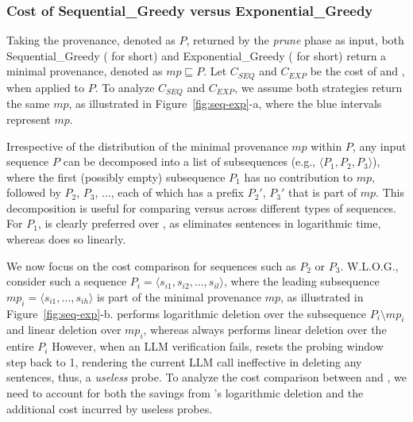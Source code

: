 \subsubsection{Cost of Sequential\_Greedy versus Exponential\_Greedy}
\label{subsubsec:seq-exp}
\leavevmode
Taking the provenance, denoted as $P$, returned by the {\em prune} phase as input, 
both Sequential\_Greedy ( for short) and Exponential\_Greedy ( for short) return a minimal provenance, denoted as $mp \sqsubseteq P$. Let $C_{SEQ}$ and $C_{EXP}$ be the cost of  and  , when applied to $P$. To analyze $C_{SEQ}$ and $C_{EXP}$, we assume  both strategies return the same  $mp$, as illustrated in Figure~\ref{fig:seq-exp}-a, where the blue intervals represent $mp$. 

Irrespective of the distribution of the minimal provenance $mp$ within $P$, any input sequence $P$ can be decomposed into a list of subsequences (e.g., $\langle P_{1}, P_{2}, P_{3}\rangle$), where the first (possibly empty) subsequence $P_1$ has no contribution to $mp$, followed by $P_2$, $P_3$, ..., each of which has a prefix $P_2'$, $P_3'$ that is part of $mp$.  
This decomposition is useful for comparing  versus  across different types of sequences. 
For $P_1$,  is clearly preferred over , as  eliminates sentences in logarithmic time, whereas  does so linearly. 

We now focus on the cost comparison for sequences such as $P_2$ or $P_3$. W.L.O.G., 
consider such a sequence $P_i = \langle s_{i1}, s_{i2}, \dots, s_{il} \rangle$, where the leading subsequence $mp_i = \langle s_{i1}, \dots, s_{ih} \rangle$ is part of the minimal provenance $mp$, as illustrated in Figure~\ref{fig:seq-exp}-b. 
   performs logarithmic deletion over the subsequence $P_i \setminus mp_i$ and linear deletion over $mp_i$, whereas  always performs linear deletion over the entire $P_i$ However, when an LLM verification fails,  resets the probing window step back to 1, rendering the current LLM call ineffective in deleting any sentences, thus, a {\em useless} probe. To analyze the cost comparison between  and , we need to account for both the savings from 's logarithmic deletion and the additional cost incurred by useless probes. 

